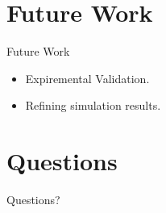 \documentclass{beamer}
\begin{document}
\section{Future Work}
\begin{frame}{Future Work}
\begin{itemize}
\item Expiremental Validation.
\item Refining simulation results. 
\end{itemize}
\end{frame}
\section*{Questions}
\begin{frame}
\begin{LARGE}
\begin{center}
Questions?
\end{center}
\end{LARGE}
\end{frame}
\end{document}
